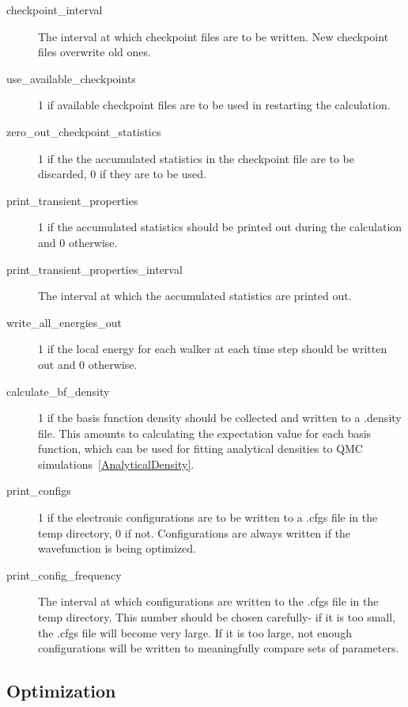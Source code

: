 \documentclass{article}
\begin{document}
\begin{description}
\item [checkpoint\_interval] The interval at which checkpoint files are
  to be written.  New checkpoint files overwrite old ones.  

\item [use\_available\_checkpoints] 1 if available checkpoint files are
  to be used in restarting the calculation.

\item [zero\_out\_checkpoint\_statistics] 1 if the the accumulated
  statistics in the checkpoint file are to be discarded, 0 if they are
  to be used.

\item [print\_transient\_properties] 1 if the accumulated statistics
  should be printed out during the calculation and 0 otherwise.

\item [print\_transient\_properties\_interval] The interval at which the
  accumulated statistics are printed out.

\item [write\_all\_energies\_out] 1 if the local energy for each
  walker at each time step should be written out and 0 otherwise.

\item [calculate\_bf\_density] 1 if the basis function density should be
  collected and written to a .density file.  This amounts to
  calculating the expectation value for each basis function, which can
  be used for fitting analytical densities to QMC
  simulations~\ref{AnalyticalDensity}.

\item [print\_configs] 1 if the electronic configurations are to be
  written to a .cfgs file in the temp directory, 0 if not.
  Configurations are always written if the wavefunction is being
  optimized.  

\item [print\_config\_frequency] The interval at which configurations are
  written to the .cfgs file in the temp directory.  This number should
  be chosen carefully- if it is too small, the .cfgs file will become
  very large.  If it is too large, not enough configurations will be
  written to meaningfully compare sets of parameters.  

\end{description}

\subsection{Optimization}
\end{document}
